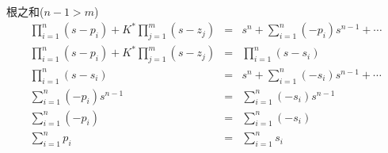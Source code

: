 \begin{frame}{根之和($n-1>m$)}
\begin{eqnarray*}
\prod_{i=1}^{n}(s-p_{i})+K^{*}\prod_{j=1}^{m}(s-z_{j}) & = & s^{n}+\sum_{i=1}^{n}(-p_{i})s^{n-1}+\cdots\\
\prod_{i=1}^{n}(s-p_{i})+K^{*}\prod_{j=1}^{m}(s-z_{j}) & = & \prod_{i=1}^{n}(s-s_{i})\\
\prod_{i=1}^{n}(s-s_{i}) & = & s^{n}+\sum_{i=1}^{n}(-s_{i})s^{n-1}+\cdots\\
\sum_{i=1}^{n}(-p_{i})s^{n-1} & = & \sum_{i=1}^{n}(-s_{i})s^{n-1}\\
\sum_{i=1}^{n}(-p_{i}) & = & \sum_{i=1}^{n}(-s_{i})\\
\sum_{i=1}^{n}p_{i} & = & \sum_{i=1}^{n}s_{i}
\end{eqnarray*}

\end{frame}

	

